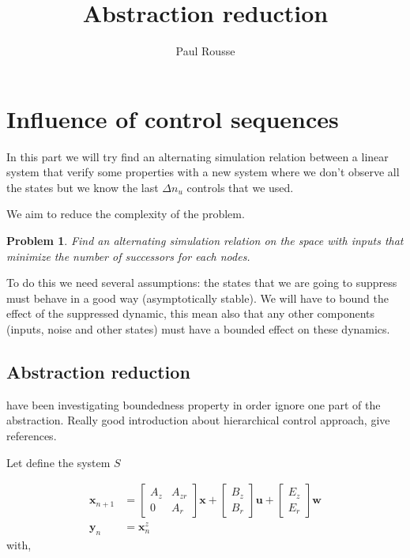 \documentclass{article}
\newtheorem{problem}{Problem}
\theoremstyle{named}
\begin{document}
\title{Abstraction reduction}
\author{Paul Rousse}

\maketitle
\section{Influence of control sequences}
In this part we will try find an alternating simulation relation between a linear system that verify some properties with a new system where we don't observe all the states but we know the last $\Delta n_u$ controls that we used.

We aim to reduce the complexity of the problem.

\begin{problem}
Find an alternating simulation relation on the space with inputs that minimize the number of successors for each nodes.
\end{problem}

To do this we need several assumptions: the states that we are going to suppress must behave in a good way (asymptotically stable).
We will have to bound the effect of the suppressed dynamic, this mean also that any other components (inputs, noise and other states) must have a bounded effect on these dynamics.

\subsection{Abstraction reduction}
\cite{liu2014abstraction} have been investigating boundedness property in order ignore one part of the abstraction.
Really good introduction about hierarchical control approach, give references.

Let define the system $S$

\begin{align*}
\mathbf{x}_{n+1} &= 
\begin{bmatrix} A_z & A_{zr}\\ 0 & A_r \end{bmatrix} \mathbf{x}
+\begin{bmatrix} B_z \\ B_r \end{bmatrix} \mathbf{u}
+\begin{bmatrix} E_z\\ E_r \end{bmatrix}\mathbf{w}\\
\mathbf{y}_n &= \mathbf{x}^z_n
\end{align*}
with,
\end{document}

